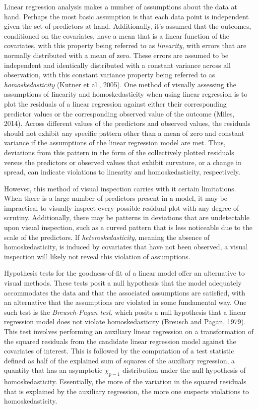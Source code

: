 		Linear regression analysis makes a number of assumptions about the data at hand. Perhaps the most basic assumption is that each data point is independent given the set of predictors at hand.
		Additionally, it's assumed that the outcomes, conditioned on the covariates, have a mean that is a linear function of the covariates, with this property being referred to as \textit{linearity},
		with errors that are normally distributed with a mean of zero. These errors are assumed to be independent and identically distributed with a constant variance across all observation, with this
		constant variance property being referred to as \textit{homoskedasticity} (Kutner et al., 2005). One method of visually assessing the assumptions of linearity and homoskedasticity when using linear
		regression is to plot the residuals of a linear regression against either their corresponding predictor values or the corresponding observed value of the outcome (Miles, 2014). Across different values
		of the predictors and observed values, the residuals should not exhibit any specific pattern other than a mean of zero and constant variance if the assumptions of the linear regression model are met.
		Thus, deviations from this pattern in the form of the collectively plotted residuals versus the predictors or observed values that exhibit curvature, or a change in spread, can indicate violations
		to linearity and homoskedasticity, respectively.

		However, this method of visual inspection carries with it certain limitations. When there is a large number of predictors present in a model, it may be impractical to visually inspect every
		possible residual plot with any degree of scrutiny. Additionally, there may be patterns in deviations that are undetectable upon visual inspection, such as a curved pattern that is less noticeable
		due to the scale of the predictors. If \textit{heteroskedasticity}, meaning the absence of homoskedasticity, is induced by covariates that have not been observed, a visual inspection will likely
		not reveal this violation of assumptions.

		Hypothesis tests for the goodness-of-fit of a linear model offer an alternative to visual methods. These tests posit a null hypothesis that the model adequately accommodates the data and that
		the associated assumptions are satisfied, with an alternative that the assumptions are violated in some fundamental way. One such test is the \textit{Breusch-Pagan test}, which posits a null hypothesis
		that a linear regression model does not violate homoskedasticity (Breusch and Pagan, 1979). This test involves performing an auxiliary linear regression on a transformation of the squared residuals from
		the candidate linear regression model against the covariates of interest. This is followed by the computation of a test statistic defined as half of the explained sum of squares of the auxiliary
		regression, a quantity that has an asymptotic $\chi_{p-1}$ distribution under the null hypothesis of homoskedasticity. Essentially, the more of the variation in the squared residuals that is explained
		by the auxiliary regression, the more one suspects violations to homoskedasticity.

